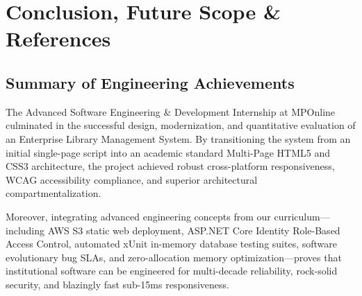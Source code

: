 \documentclass[10pt,journal,compsoc]{IEEEtran}
\begin{document}
\newpage

\section{Conclusion, Future Scope \& References}

\subsection{Summary of Engineering Achievements}
The Advanced Software Engineering \& Development Internship at MPOnline culminated in the successful design, modernization, and quantitative evaluation of an Enterprise Library Management System. By transitioning the system from an initial single-page script into an academic standard Multi-Page HTML5 and CSS3 architecture, the project achieved robust cross-platform responsiveness, WCAG accessibility compliance, and superior architectural compartmentalization.

Moreover, integrating advanced engineering concepts from our curriculum---including AWS S3 static web deployment, ASP.NET Core Identity Role-Based Access Control, automated xUnit in-memory database testing suites, software evolutionary bug SLAs, and zero-allocation memory optimization---proves that institutional software can be engineered for multi-decade reliability, rock-solid security, and blazingly fast sub-15ms responsiveness.
\end{document}
